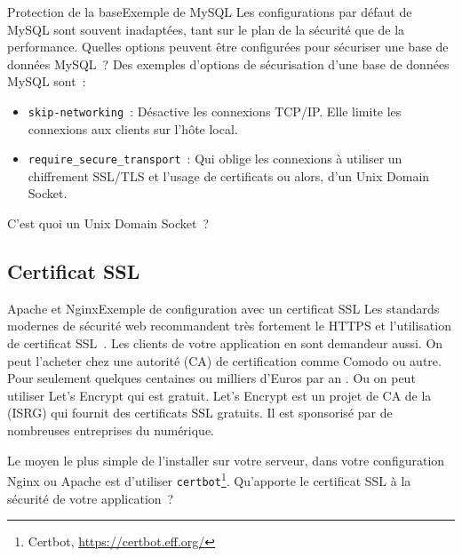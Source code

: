 \documentclass{beamer}
\begin{document}
    \begin{frame}{Protection de la base}{Exemple de MySQL}
        Les configurations par défaut de MySQL sont souvent inadaptées, tant sur le plan de la sécurité que de la performance.
        \bigbreak
        Quelles options peuvent être configurées pour sécuriser une base de données MySQL~?
        \pause
        \bigbreak
        Des exemples d'options de sécurisation d'une base de données MySQL sont~:
        \begin{itemize}
            \item \lstinline{skip-networking}~: Désactive les connexions TCP/IP.
            Elle limite les connexions aux clients sur l'hôte local.
            \item \lstinline{require_secure_transport}~: Qui oblige les connexions à utiliser un chiffrement SSL/TLS et l'usage de certificats ou alors, d'un Unix Domain Socket.
        \end{itemize}
        C'est quoi un Unix Domain Socket~?
    \end{frame}

    \subsection{Certificat SSL}\label{subsec:certificat-ssl}
    \begin{frame}{Apache et Nginx}{Exemple de configuration avec un certificat SSL}
        Les standards modernes de sécurité web recommandent très fortement le HTTPS et l'utilisation de certificat SSL~.
        Les clients de votre application en sont demandeur aussi.
        \bigbreak
        On peut l'acheter chez une autorité (CA) de certification comme Comodo ou autre.
        Pour seulement quelques centaines ou milliers d'Euros par an .
        Ou on peut utiliser Let's Encrypt qui est gratuit.
        \bigbreak
        Let's Encrypt est un projet de CA de la  (ISRG) qui fournit des certificats SSL gratuits.
        Il est sponsorisé par de nombreuses entreprises du numérique.

        Le moyen le plus simple de l'installer sur votre serveur, dans votre configuration Nginx ou Apache est d'utiliser \lstinline{certbot}\footnote{Certbot, \url{https://certbot.eff.org/}}.
        \bigbreak
        Qu'apporte le certificat SSL à la sécurité de votre application~?
    \end{frame}
\end{document}
